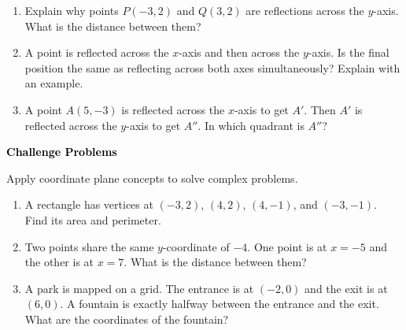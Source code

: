 \documentclass[12pt, letterpaper, fleqn]{article}
\begin{document}
\vspace{3mm}
\begin{enumerate}[itemsep=2.3cm, leftmargin=0.6cm]
\item Explain why points $P(-3, 2)$ and $Q(3, 2)$ are reflections across the $y$-axis. What is the distance between them?

\vspace{2.2cm}

\item A point is reflected across the $x$-axis and then across the $y$-axis. Is the final position the same as reflecting across both axes simultaneously? Explain with an example.

\vspace{2.2cm}

\item A point $A(5, -3)$ is reflected across the $x$-axis to get $A'$. Then $A'$ is reflected across the $y$-axis to get $A''$. In which quadrant is $A''$?

\vspace{2.2cm}

\end{enumerate}

\newpage

\begin{tcolorbox}[colback=black!10]
\large\textcolor{black}{\textbf{Challenge Problems}}
\end{tcolorbox}

\noindent
Apply coordinate plane concepts to solve complex problems.

\vspace{3mm}
\begin{enumerate}[itemsep=2.4cm, leftmargin=0.6cm]
\item A rectangle has vertices at $(-3, 2)$, $(4, 2)$, $(4, -1)$, and $(-3, -1)$. Find its area and perimeter.

\vspace{2.3cm}

\item Two points share the same $y$-coordinate of $-4$. One point is at $x = -5$ and the other is at $x = 7$. What is the distance between them?

\vspace{2.3cm}

\item A park is mapped on a grid. The entrance is at $(-2, 0)$ and the exit is at $(6, 0)$. A fountain is exactly halfway between the entrance and the exit. What are the coordinates of the fountain?

\vspace{2.5cm}

\end{enumerate}
\end{document}
